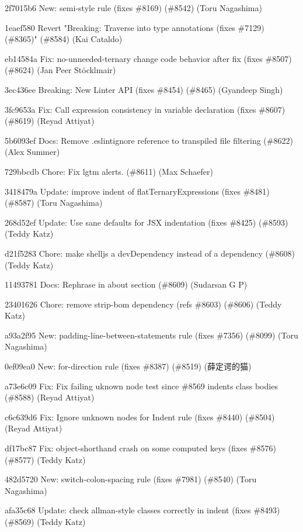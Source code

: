 \begin{DoxyItemize}
\item 2f7015b6 New\+: semi-\/style rule (fixes \#8169) (\#8542) (Toru Nagashima)
\item 1eaef580 Revert "{}\+Breaking\+: Traverse into type annotations (fixes \#7129) (\#8365)"{} (\#8584) (Kai Cataldo)
\item eb14584a Fix\+: no-\/unneeded-\/ternary change code behavior after fix (fixes \#8507) (\#8624) (Jan Peer Stöcklmair)
\item 3ec436ee Breaking\+: New Linter API (fixes \#8454) (\#8465) (Gyandeep Singh)
\item 3fc9653a Fix\+: Call expression consistency in variable declaration (fixes \#8607) (\#8619) (Reyad Attiyat)
\item 5b6093ef Docs\+: Remove .eslintignore reference to transpiled file filtering (\#8622) (Alex Summer)
\item 729bbcdb Chore\+: Fix lgtm alerts. (\#8611) (Max Schaefer)
\item 3418479a Update\+: improve indent of {\ttfamily flat\+Ternary\+Expressions} (fixes \#8481) (\#8587) (Toru Nagashima)
\item 268d52ef Update\+: Use sane defaults for JSX indentation (fixes \#8425) (\#8593) (Teddy Katz)
\item d21f5283 Chore\+: make shelljs a dev\+Dependency instead of a dependency (\#8608) (Teddy Katz)
\item 11493781 Docs\+: Rephrase in about section (\#8609) (Sudarsan G P)
\item 23401626 Chore\+: remove strip-\/bom dependency (refs \#8603) (\#8606) (Teddy Katz)
\item a93a2f95 New\+: padding-\/line-\/between-\/statements rule (fixes \#7356) (\#8099) (Toru Nagashima)
\item 0ef09ea0 New\+: for-\/direction rule (fixes \#8387) (\#8519) (薛定谔的猫)
\item a73e6c09 Fix\+: Fix failing uknown node test since \#8569 indents class bodies (\#8588) (Reyad Attiyat)
\item c6c639d6 Fix\+: Ignore unknown nodes for Indent rule (fixes \#8440) (\#8504) (Reyad Attiyat)
\item df17bc87 Fix\+: object-\/shorthand crash on some computed keys (fixes \#8576) (\#8577) (Teddy Katz)
\item 482d5720 New\+: switch-\/colon-\/spacing rule (fixes \#7981) (\#8540) (Toru Nagashima)
\item afa35c68 Update\+: check allman-\/style classes correctly in indent (fixes \#8493) (\#8569) (Teddy Katz)

\end{DoxyItemize}
